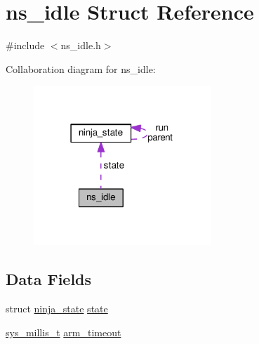 \hypertarget{structns__idle}{\section{ns\+\_\+idle Struct Reference}
\label{structns__idle}
}


{\ttfamily \#include $<$ns\+\_\+idle.\+h$>$}



Collaboration diagram for ns\+\_\+idle\+:\nopagebreak
\begin{figure}[H]
\begin{center}
\leavevmode
\includegraphics[width=190pt]{structns__idle__coll__graph}
\end{center}
\end{figure}
\subsection*{Data Fields}
\begin{DoxyCompactItemize}
\item 
struct \hyperlink{structninja__state}{ninja\+\_\+state} \hyperlink{structns__idle_a41f1bb6c506d7c69175a14667af80d78}{state}
\item 
\hyperlink{system__calls_8h_a62a9a2e72861132c17d4d4b29bb8b80a}{sys\+\_\+millis\+\_\+t} \hyperlink{structns__idle_a3845755649e487478f2f74be5f5ed449}{arm\+\_\+timeout}
\end{DoxyCompactItemize}


